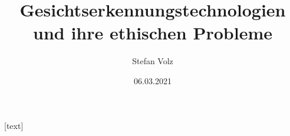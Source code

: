 

\usepackage[german]{babel}
\usepackage{newunicodechar}
\usepackage[utf8]{inputenc}

\usepackage{subcaption}
\usepackage{adjustbox}
\usepackage{booktabs}
\usepackage[scale=2]{ccicons}

\usepackage{algorithm}
\usepackage[noend]{algpseudocode}
\makeatletter
\def\BState{\State\hskip-\ALG@thistlm}
\makeatother
%

\usepackage{multirow}
\usepackage[none]{hyphenat}
\usepackage{textcomp}
\usepackage{gensymb}
\sloppy


\usepackage{pgfplots}

\usepackage{xspace}
\newcommand{\themename}{\textbf{\textsc{metropolis}}\xspace}

\usepackage{graphicx}
\graphicspath{ {./img/} }

\usepackage{fancyhdr}

\usepackage[backend=biber, style=alphabetic]{biblatex}

[text] %

\usepackage{csquotes}
\usepackage{epigraph}


\title{Gesichtserkennungstechnologien und ihre ethischen Probleme}
\subtitle{}
\date{06.03.2021}
\author{Stefan Volz}


\newcommand{\nologo}{\setbeamertemplate{logo}{}} %
\newcommand{\congress}{Gesichtserkennung}

\newcommand{\sourceCaption}[2]{{\caption*{\tiny{Quelle: #1}}\vspace*{-.5cm}
      \caption{#2}}}

\captionsetup[figure]{labelformat=empty}%


\renewcommand*{\bibfont}{\small} %

